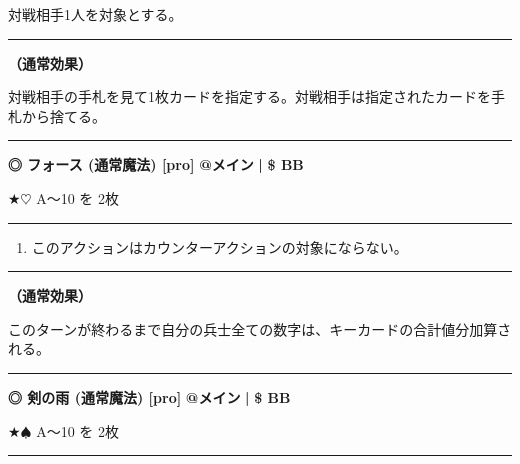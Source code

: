 \documentclass[twocolumn,a5paper,papersize,10pt]{jarticle}
\begin{document}
対戦相手1人を対象とする。
\vspace{1mm}%
\hrule height 0.1mm depth 0mm width 66.5mm %
\vspace{1mm}%

{\bf（通常効果）}

対戦相手の手札を見て1枚カードを指定する。対戦相手は指定されたカードを手札から捨てる。
\vspace{2mm} %
\hrule height 0.5mm depth 0mm width 66.5mm %
\vspace{1mm} %
{\normalsize\bf ◎ フォース {\scriptsize (通常魔法) [pro]}} %
\hfill 
{\small\bf @メイン }
  {\small\bf | } {\small\bf \$ BB}

★{\normalsize $\heartsuit$} A〜10 を 2枚

\vspace{1mm}%
\hrule height 0.1mm depth 0mm width 66.5mm %
\vspace{1mm}%


\vspace{-1zh}%
\begin{enumerate}
\renewcommand{\labelenumi}{※}
\setlength{\leftskip}{-0.3cm}
\setlength{\itemsep}{0pt} %
\setlength{\parskip}{0pt} %

\item このアクションはカウンターアクションの対象にならない。

\vspace{-3mm}%
\end{enumerate}
\vspace{1mm}%
\hrule height 0.1mm depth 0mm width 66.5mm %
\vspace{1mm}%

{\bf（通常効果）}

このターンが終わるまで自分の兵士全ての数字は、キーカードの合計値分加算される。
\vspace{2mm} %
\hrule height 0.5mm depth 0mm width 66.5mm %
\vspace{1mm} %
{\normalsize\bf ◎ 剣の雨 {\scriptsize (通常魔法) [pro]}} %
\hfill 
{\small\bf @メイン }
  {\small\bf | } {\small\bf \$ BB}

★{\normalsize $\spadesuit$} A〜10 を 2枚

\vspace{1mm}%
\hrule height 0.1mm depth 0mm width 66.5mm %
\vspace{1mm}%
\end{document}
